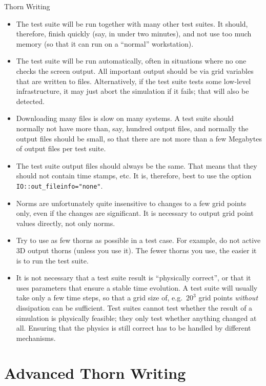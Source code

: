 \begin{cactuspart}{Thorn Writing}
\begin{itemize}
\item The test suite will be run together with many other test
  suites.  It should, therefore, finish quickly (say, in under two
  minutes), and not use too much memory (so that it can run on a
  ``normal'' workstation).
\item The test suite will be run automatically, often in situations
  where no one checks the screen output.  All important output should
  be via grid variables that are written to files.  Alternatively, if
  the test suite tests some low-level infrastructure, it may just
  abort the simulation if it fails; that will also be detected.
\item Downloading many files is slow on many systems.  A test suite
  should normally not have more than, say, hundred output files, and
  normally the output files should be small, so that there are not
  more than a few Megabytes of output files per test suite.
\item The test suite output files should always be the same.  That
  means that they should not contain time stamps, etc.  It is,
  therefore, best to use the option \verb|IO::out_fileinfo="none"|.
\item Norms are unfortunately quite insensitive to changes to a few
  grid points only, even if the changes are significant.  It is
  necessary to output grid point values directly, not only norms.
\item Try to use as few thorns as possible in a test case.  For example, do
  not active 3D output thorns (unless you use it).  The fewer thorns
  you use, the easier it is to run the test suite.
\item It is not necessary that a test suite result is ``physically
  correct'', or that it uses parameters that ensure a stable time
  evolution.  A test suite will usually take only a few time steps, so
  that a grid size of, e.g.\ $20^3$ grid points \emph{without}
  dissipation can be sufficient.  Test suites cannot test whether the
  result of a simulation is physically feasible; they only test
  whether anything changed at all.  Ensuring that the physics is still
  correct has to be handled by different mechanisms.
\end{itemize}


\section{Advanced Thorn Writing}


\end{cactuspart}
